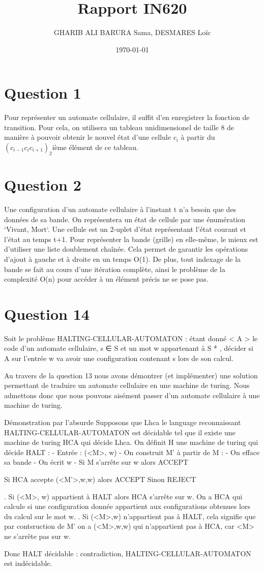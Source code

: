 \documentclass{article}
\title{Rapport IN620}
\date{\today}
\author{GHARIB ALI BARURA Sama, DESMARES Loïc}
\begin{document}
  \maketitle

  \newpage

  \section{Question 1}
    Pour représenter un automate cellulaire, il suffit d'en enregistrer la fonction de
  transition. Pour cela, on utilisera un tableau unidimensionel de taille 8 de manière
  à pouvoir obtenir le nouvel état d'une cellule \(c_i\) à partir du
  \((c_{i-1} c_i c_{i+1})_2\)ième élément de ce tableau.

  \section{Question 2}
      Une configuration d'un automate cellulaire à l'instant t n'a besoin que des données
  de sa bande. On représentera un état de cellule par une énumération `Vivant, Mort`.
  Une cellule est un 2-uplet d'état représentant l'état courant et l'état au temps t+1.
  Pour représenter la bande (grille) en elle-même, le mieux est d'utiliser une liste doublement
  chaînée. Cela permet de garantir les opérations d'ajout à gauche et à droite en un temps
  O(1). De plus, tout indexage de la bande se fait au cours d'une itération complète, ainsi
  le problème de la complexité O(n) pour accéder à un élément précis ne se pose pas.

  \section{Question 14}
      Soit le problème HALTING-CELLULAR-AUTOMATON : étant donné < A > le code
  d’un automate cellulaire, s ∈ S et un mot w appartenant à S * , décider si A sur l’entrée w va avoir une configuration
  contenant s lors de son calcul.

  Au travers de la question 13 nous avons démontrer (et implémenter) une solution permettant de traduire un 
  automate cellulaire en une machine de turing.
  Nous admettons donc que nous pouvons aisément passer d'un automate cellulaire à une machine de turing.

  Démonstration par l'absurde
  Supposons que Lhca le language reconnaissant HALTING-CELLULAR-AUTOMATON est décidable tel que il existe 
  une machine de turing HCA qui décide Lhca.
  On définit H une machine de turing qui décide HALT :
  - Entrée : (<M>, w)
  - On construit M' à partir de M :
    - On efface sa bande
    - On écrit w
    - Si M s'arrête sur w alors ACCEPT

  Si HCA accepte (<M'>,w,w) alors ACCEPT
    Sinon REJECT

  . Si (<M>, w) appartient à HALT alors HCA s'arrête sur w. On a HCA qui calcule si une configuration donnée 
  appartient aux configurations obtenues lors du calcul sur le mot w.
  . Si (<M>,w) n'appartient pas à HALT, cela signifie que par contsruction de M' on a (<M>,w,w) qui n'appartient pas à HCA, car <M> ne s'arrête pas sur w.

  Donc HALT décidable : contradiction, HALTING-CELLULAR-AUTOMATON est indécidable.
  
\end{document}
